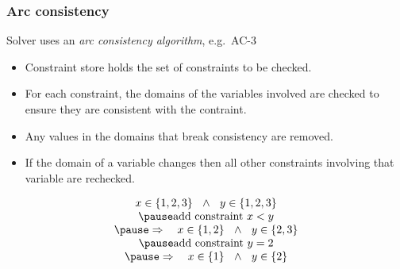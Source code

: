 \documentclass[aspectratio=169,hyphens]{beamer} %
\begin{document}
\begin{frame}[fragile]
    \frametitle{Arc consistency}
Solver uses an \emph{arc consistency algorithm}, e.g.\ AC-3
\begin{itemize}
    \item Constraint store holds the set of constraints to be checked.
        \pause
    \item For each constraint, the domains of the variables involved are checked to
        ensure they are consistent with the contraint.
        \pause
    \item Any values in the domains that break consistency are removed.
        \pause
    \item If the domain of a variable changes then all other constraints involving that variable are
        rechecked.
\end{itemize}
\pause
\begin{example}
\begin{displaymath}
    \begin{array}{c}
    x \in \{1, 2, 3\} ~~\land~~ y \in \{1, 2, 3\} \\
    \pause
    \textrm{add constraint~} x < y \\
    \pause
    \Rightarrow ~~~ x \in \{1, 2\} ~~\land~~ y \in \{2, 3\} \\
    \pause
    \textrm{add constraint~} y = 2 \\
    \pause
        \Rightarrow ~~~ x \in \{1\} ~~\land~~ y \in \{2\}
    \end{array}
\end{displaymath}
\end{example}
\end{frame}
\end{document}
